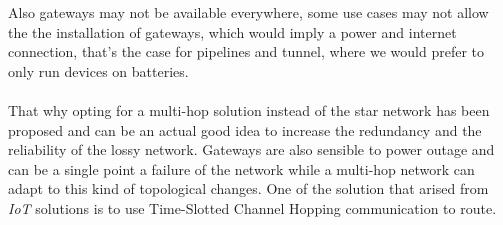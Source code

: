 Also gateways may not be available everywhere, some use cases may not allow the
the installation of gateways, which would imply a power and internet
connection, that's the case for pipelines and tunnel, %
where we would prefer to only run devices on batteries.




\paragraph{}

That why opting for a multi-hop solution instead of the star network has been
proposed and can be an actual good idea to increase the redundancy and the
reliability of the lossy network. Gateways are also sensible to power outage
and can be a single point a failure of the network while a multi-hop network
can adapt to this kind of topological changes. 
One of the solution that arised from \emph{IoT} solutions is to use
Time-Slotted Channel Hopping communication to route.


